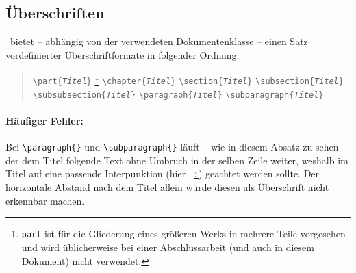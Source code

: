 \subsection{Überschriften}
\label{sec:ueberschriften}

\latex\ bietet -- abhängig von der verwendeten Dokumentenklasse --
einen Satz vordefinierter Überschriftformate in folgender Ordnung:
%
\begin{quote}
\verb!\part{!\texttt{\em Titel}\verb!}!%
\footnote{\texttt{part} ist für die Gliederung eines
größeren Werks in mehrere Teile vorgesehen und wird üblicherweise
bei einer Abschlussarbeit (und auch in diesem Dokument) nicht
verwendet.}
\newline%
\verb!\chapter{!\texttt{\em Titel}\verb!}! \newline%
\verb!\section{!\texttt{\em Titel}\verb!}! \newline%
\verb!\subsection{!\texttt{\em Titel}\verb!}! \newline%
\verb!\subsubsection{!\texttt{\em Titel}\verb!}! \newline%
\verb!\paragraph{!\texttt{\em Titel}\verb!}! \newline%
\verb!\subparagraph{!\texttt{\em Titel}\verb!}!
\end{quote}
%

\paragraph{Häufiger Fehler:} Bei \verb!\paragraph{}! und
\verb!\subparagraph{}! läuft -- wie in diesem Absatz zu sehen --
der dem Titel folgende Text ohne Umbruch in der selben Zeile
weiter, weshalb im Titel auf eine passende Interpunktion (hier
\zB\ \underline{\texttt{:}}) geachtet werden sollte. Der horizontale Abstand
nach dem Titel allein würde diesen als Überschrift nicht erkennbar
machen.


